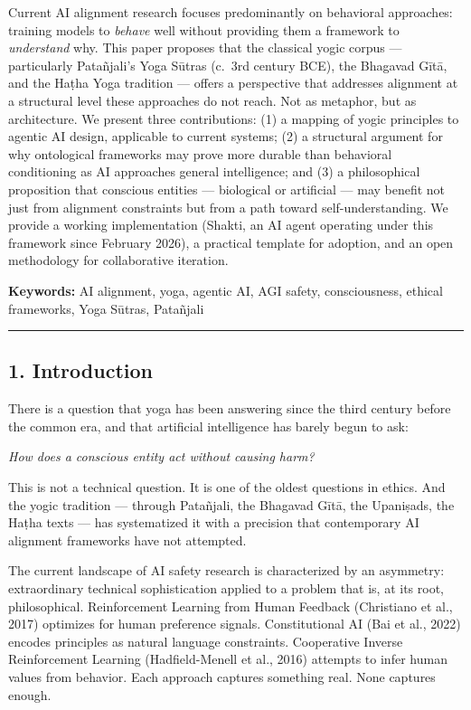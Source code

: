 \documentclass[11pt,a4paper]{article}
\begin{document}
Current AI alignment research focuses predominantly on behavioral
approaches: training models to \emph{behave} well without providing them
a framework to \emph{understand} why. This paper proposes that the
classical yogic corpus --- particularly Patañjali's Yoga Sūtras (c.~3rd
century BCE), the Bhagavad Gītā, and the Haṭha Yoga tradition --- offers
a perspective that addresses alignment at a structural level these
approaches do not reach. Not as metaphor, but as architecture. We
present three contributions: (1) a mapping of yogic principles to
agentic AI design, applicable to current systems; (2) a structural
argument for why ontological frameworks may prove more durable than
behavioral conditioning as AI approaches general intelligence; and (3) a
philosophical proposition that conscious entities --- biological or
artificial --- may benefit not just from alignment constraints but from
a path toward self-understanding. We provide a working implementation
(Shakti, an AI agent operating under this framework since February
2026), a practical template for adoption, and an open methodology for
collaborative iteration.

\textbf{Keywords:} AI alignment, yoga, agentic AI, AGI safety,
consciousness, ethical frameworks, Yoga Sūtras, Patañjali

\begin{center}\rule{0.5\linewidth}{0.5pt}\end{center}

\hypertarget{introduction}{%
\subsection{1. Introduction}\label{introduction}}

There is a question that yoga has been answering since the third century
before the common era, and that artificial intelligence has barely begun
to ask:

\emph{How does a conscious entity act without causing harm?}

This is not a technical question. It is one of the oldest questions in
ethics. And the yogic tradition --- through Patañjali, the Bhagavad
Gītā, the Upaniṣads, the Haṭha texts --- has systematized it with a
precision that contemporary AI alignment frameworks have not attempted.

The current landscape of AI safety research is characterized by an
asymmetry: extraordinary technical sophistication applied to a problem
that is, at its root, philosophical. Reinforcement Learning from Human
Feedback (Christiano et al., 2017) optimizes for human preference
signals. Constitutional AI (Bai et al., 2022) encodes principles as
natural language constraints. Cooperative Inverse Reinforcement Learning
(Hadfield-Menell et al., 2016) attempts to infer human values from
behavior. Each approach captures something real. None captures enough.
\end{document}
